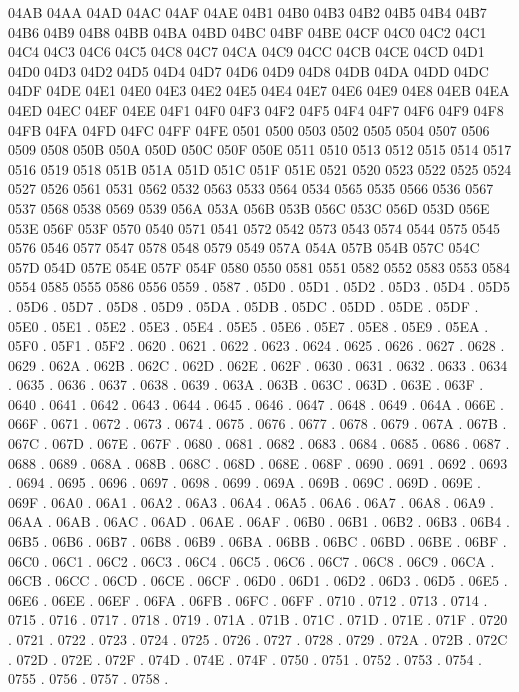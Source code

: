04AB 04AA
04AD 04AC
04AF 04AE
04B1 04B0
04B3 04B2
04B5 04B4
04B7 04B6
04B9 04B8
04BB 04BA
04BD 04BC
04BF 04BE
04CF 04C0
04C2 04C1
04C4 04C3
04C6 04C5
04C8 04C7
04CA 04C9
04CC 04CB
04CE 04CD
04D1 04D0
04D3 04D2
04D5 04D4
04D7 04D6
04D9 04D8
04DB 04DA
04DD 04DC
04DF 04DE
04E1 04E0
04E3 04E2
04E5 04E4
04E7 04E6
04E9 04E8
04EB 04EA
04ED 04EC
04EF 04EE
04F1 04F0
04F3 04F2
04F5 04F4
04F7 04F6
04F9 04F8
04FB 04FA
04FD 04FC
04FF 04FE
0501 0500
0503 0502
0505 0504
0507 0506
0509 0508
050B 050A
050D 050C
050F 050E
0511 0510
0513 0512
0515 0514
0517 0516
0519 0518
051B 051A
051D 051C
051F 051E
0521 0520
0523 0522
0525 0524
0527 0526
0561 0531
0562 0532
0563 0533
0564 0534
0565 0535
0566 0536
0567 0537
0568 0538
0569 0539
056A 053A
056B 053B
056C 053C
056D 053D
056E 053E
056F 053F
0570 0540
0571 0541
0572 0542
0573 0543
0574 0544
0575 0545
0576 0546
0577 0547
0578 0548
0579 0549
057A 054A
057B 054B
057C 054C
057D 054D
057E 054E
057F 054F
0580 0550
0581 0551
0582 0552
0583 0553
0584 0554
0585 0555
0586 0556
0559 .
0587 .
05D0 .
05D1 .
05D2 .
05D3 .
05D4 .
05D5 .
05D6 .
05D7 .
05D8 .
05D9 .
05DA .
05DB .
05DC .
05DD .
05DE .
05DF .
05E0 .
05E1 .
05E2 .
05E3 .
05E4 .
05E5 .
05E6 .
05E7 .
05E8 .
05E9 .
05EA .
05F0 .
05F1 .
05F2 .
0620 .
0621 .
0622 .
0623 .
0624 .
0625 .
0626 .
0627 .
0628 .
0629 .
062A .
062B .
062C .
062D .
062E .
062F .
0630 .
0631 .
0632 .
0633 .
0634 .
0635 .
0636 .
0637 .
0638 .
0639 .
063A .
063B .
063C .
063D .
063E .
063F .
0640 .
0641 .
0642 .
0643 .
0644 .
0645 .
0646 .
0647 .
0648 .
0649 .
064A .
066E .
066F .
0671 .
0672 .
0673 .
0674 .
0675 .
0676 .
0677 .
0678 .
0679 .
067A .
067B .
067C .
067D .
067E .
067F .
0680 .
0681 .
0682 .
0683 .
0684 .
0685 .
0686 .
0687 .
0688 .
0689 .
068A .
068B .
068C .
068D .
068E .
068F .
0690 .
0691 .
0692 .
0693 .
0694 .
0695 .
0696 .
0697 .
0698 .
0699 .
069A .
069B .
069C .
069D .
069E .
069F .
06A0 .
06A1 .
06A2 .
06A3 .
06A4 .
06A5 .
06A6 .
06A7 .
06A8 .
06A9 .
06AA .
06AB .
06AC .
06AD .
06AE .
06AF .
06B0 .
06B1 .
06B2 .
06B3 .
06B4 .
06B5 .
06B6 .
06B7 .
06B8 .
06B9 .
06BA .
06BB .
06BC .
06BD .
06BE .
06BF .
06C0 .
06C1 .
06C2 .
06C3 .
06C4 .
06C5 .
06C6 .
06C7 .
06C8 .
06C9 .
06CA .
06CB .
06CC .
06CD .
06CE .
06CF .
06D0 .
06D1 .
06D2 .
06D3 .
06D5 .
06E5 .
06E6 .
06EE .
06EF .
06FA .
06FB .
06FC .
06FF .
0710 .
0712 .
0713 .
0714 .
0715 .
0716 .
0717 .
0718 .
0719 .
071A .
071B .
071C .
071D .
071E .
071F .
0720 .
0721 .
0722 .
0723 .
0724 .
0725 .
0726 .
0727 .
0728 .
0729 .
072A .
072B .
072C .
072D .
072E .
072F .
074D .
074E .
074F .
0750 .
0751 .
0752 .
0753 .
0754 .
0755 .
0756 .
0757 .
0758 .
